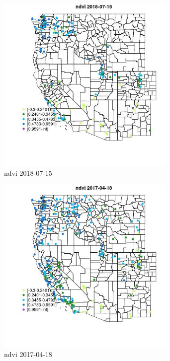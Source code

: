 \begin{figure} 
\centering  
\includegraphics[width=0.77\textwidth]{Code_Outputs/Report_ML_input_PM25_Step4_part_e_de_duplicated_aves_compiled_2019-05-20wNAs_MapObsndvi2018-07-15.jpg} 
\caption{\label{fig:Report_ML_input_PM25_Step4_part_e_de_duplicated_aves_compiled_2019-05-20wNAsMapObsndvi2018-07-15}ndvi 2018-07-15} 
\end{figure} 
 

\begin{figure} 
\centering  
\includegraphics[width=0.77\textwidth]{Code_Outputs/Report_ML_input_PM25_Step4_part_e_de_duplicated_aves_compiled_2019-05-20wNAs_MapObsndvi2017-04-18.jpg} 
\caption{\label{fig:Report_ML_input_PM25_Step4_part_e_de_duplicated_aves_compiled_2019-05-20wNAsMapObsndvi2017-04-18}ndvi 2017-04-18} 
\end{figure} 
 
